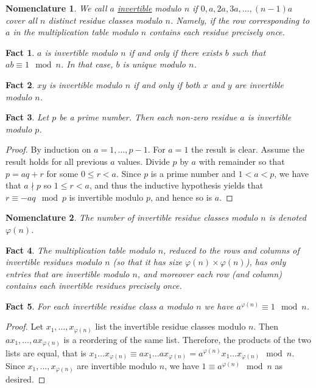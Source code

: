 \documentclass[12pt]{article}
\newtheorem*{fact*}{Fact}
\newtheorem*{nomn*}{Nomenclature}
\newcommand{\vphi}{\varphi}
\begin{document}
\begin{nomn*}
We call $a$ \underline{invertible} modulo $n$ if $0,a,2a,3a,\dots,(n-1)a$ cover all $n$ distinct residue classes modulo $n$. Namely, if the row corresponding to $a$ in the multiplication table modulo $n$ contains each residue precisely once. 
\end{nomn*}


\begin{fact*}
$a$ is invertible modulo $n$ if and only if there exists $b$ such that $ab\equiv 1\mod n$. In that case, $b$ is unique modulo $n$.
\end{fact*}


\begin{fact*}
$xy$ is invertible modulo $n$ if and only if both $x$ and $y$ are invertible modulo $n$.
\end{fact*}


\begin{fact*}
Let $p$ be a prime number. Then each non-zero residue $a$ is invertible modulo $p$.
\end{fact*}


\begin{proof}
By induction on $a=1,\dots,p-1$. For $a=1$ the result is clear. Assume the result holds for all previous $a$ values. Divide $p$ by $a$ with remainder so that $p=aq+r$ for some $0\le r < a$. Since $p$ is a prime number and $1 < a < p$, we have that $a\nmid p$ so $1\le r < a$, and thus the inductive hypothesis yields that $r\equiv -aq \mod p$ is invertible modulo $p$, and hence so is $a$. 
\end{proof}


\begin{nomn*}
The number of invertible residue classes modulo $n$ is denoted $\vphi(n)$.
\end{nomn*}


\begin{fact*}
The multiplication table modulo $n$, reduced to the rows and columns of invertible residues modulo $n$ (so that it has size $\vphi(n)\times \vphi(n)$), has only entries that are invertible modulo $n$, and moreover each row (and column) contains each invertible residues precisely once. 
\end{fact*}


\begin{fact*}
For each invertible residue class $a$ modulo $n$ we have $a^{\vphi(n)}\equiv 1\mod n$.
\end{fact*}


\begin{proof}
Let $x_1,\dots,x_{\vphi(n)}$ list the invertible residue classes modulo $n$. Then $ax_1,\dots,ax_{\vphi(n)}$ is a reordering of the same list. Therefore, the products of the two lists are equal, that is $x_1\dots x_{\vphi(n)} \equiv ax_1 \dots ax_{\vphi(n)} = a^{\vphi(n)}x_1\dots x_{\vphi(n)} \mod n$. Since $x_1,\dots,x_{\vphi(n)}$ are invertible modulo $n$, we have $1\equiv a^{\vphi(n)} \mod n$ as desired.
\end{proof}
\end{document}
